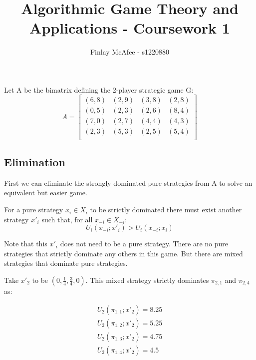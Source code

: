 \documentclass[11pt]{article}
\begin{document}
%
\author{Finlay McAfee - s1220880}
\title{Algorithmic Game Theory and Applications - Coursework 1}
\maketitle

\section{}
Let A be the bimatrix defining the 2-player strategic game G:
\begin{equation}
  A = 
  \begin{bmatrix}
    (6, 8) & (2,9) & (3,8) & (2,8) \\
    (0, 5) & (2,3) & (2,6) & (8,4) \\
    (7, 0) & (2,7) & (4,4) & (4,3) \\
    (2, 3) & (5,3) & (2,5) & (5,4) \\
  \end{bmatrix}
\end{equation}
\subsection{Elimination}
First we can eliminate the strongly dominated pure strategies from A to solve an equivalent but easier game.

For a pure strategy $x_i \in X_i$ to be strictly dominated there must exist another strategy $x'_i$ such that, for all $x_{-i} \in X_{-i}$:
\begin{equation}
  U_i(x_{-i};x'_i) > U_i(x_{-i};x_i)
\end{equation}

Note that this $x'_i$ does not need to be a pure strategy. There are no pure strategies that strictly dominate any others in this game. But there are mixed strategies that dominate pure strategies.

Take $x'_2$ to be $(0,\frac{1}{4},\frac{3}{4},0)$. This mixed strategy strictly dominates $\pi_{2,1}$ and $\pi_{2,4}$ as:

\begin{align}
  U_2(\pi_{1,1};x'_2) = 8.25 \\
  U_2(\pi_{1,2};x'_2) = 5.25 \\
  U_2(\pi_{1,3};x'_2) = 4.75 \\
  U_2(\pi_{1,4};x'_2) = 4.5
\end{align}
\end{document}
